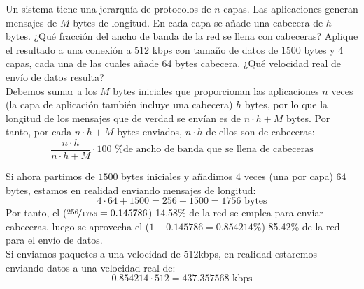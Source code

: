\begin{ejercicio}
 Un sistema tiene una jerarquía de protocolos de $n$ capas. Las aplicaciones generan mensajes de $M$ bytes de longitud. En cada capa se añade una cabecera de $h$ bytes. ¿Qué fracción del ancho de banda de la red se llena con cabeceras? Aplique el resultado a una conexión a 512 kbps con tamaño de datos de 1500 bytes y 4 capas, cada una de las cuales añade 64 bytes cabecera. ¿Qué velocidad real de envío de datos resulta?\\

 Debemos sumar a los $M$ bytes iniciales que proporcionan las aplicaciones $n$ veces (la capa de aplicación también incluye una cabecera) $h$ bytes, por lo que la longitud de los mensajes que de verdad se envían es de $n\cdot h + M$ bytes. Por tanto, por cada $n\cdot h + M$ bytes enviados, $n\cdot h$ de ellos son de cabeceras:
 \begin{equation*}
     \dfrac{n\cdot h}{n\cdot h + M}\cdot 100 \text{\ \ \% de ancho de banda que se llena de cabeceras}
 \end{equation*}

 Si ahora partimos de $1500$ bytes iniciales y añadimos 4 veces (una por capa) $64$ bytes, estamos en realidad enviando mensajes de longitud:
 \begin{equation*}
     4\cdot 64 + 1500 = 256 + 1500 = 1756 \text{\ bytes}
 \end{equation*}
 Por tanto, el ($\nicefrac{256}{1756} = 0.145786$) 14.58\% de la red se emplea para enviar cabeceras, luego se aprovecha el ($1-0.145786 = 0.854214\%$) 85.42\% de la red para el envío de datos.\\

 Si enviamos paquetes a una velocidad de 512kbps, en realidad estaremos enviando datos a una velocidad real de:
 \begin{equation*}
     0.854214 \cdot 512 = 437.357568 \text{\ kbps}
 \end{equation*}
\end{ejercicio}

